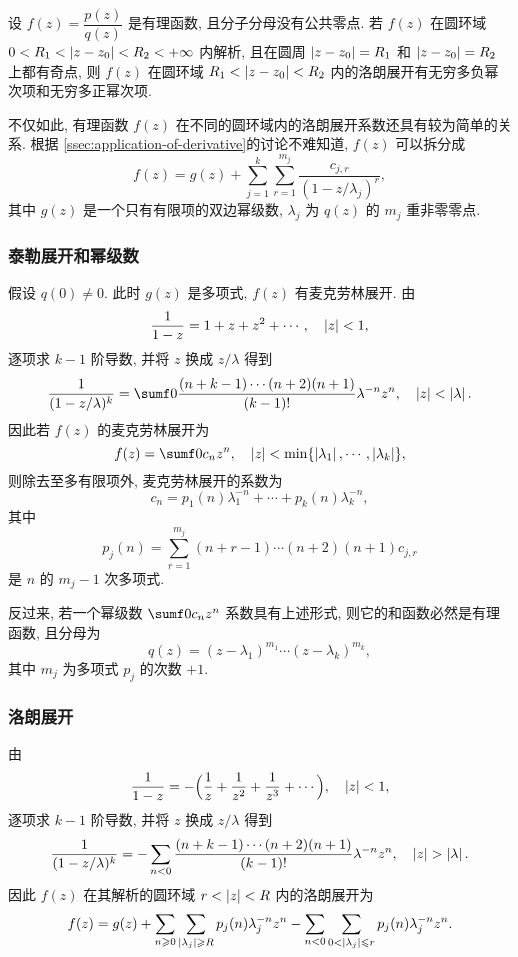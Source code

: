 \begin{example}
  设 $f(z)=\dfrac{p(z)}{q(z)}$ 是有理函数, 且分子分母没有公共零点.
  若 $f(z)$ 在圆环域 $0<R_1<\left|z-z_0\right|<R_2<+\infty$ 内解析, 且在圆周 $\left|z-z_0\right|=R_1$ 和 $\left|z-z_0\right|=R_2$ 上都有奇点, 则 $f(z)$ 在圆环域 $R_1<\left|z-z_0\right|<R_2$ 内的洛朗展开有无穷多负幂次项和无穷多正幂次项.
\end{example}

不仅如此, 有理函数 $f(z)$ 在不同的圆环域内的洛朗展开系数还具有较为简单的关系.
根据 \ref{ssec:application-of-derivative}的讨论不难知道, $f(z)$ 可以拆分成
\[
  f(z)=g(z)+\sum_{j=1}^k \sum_{r=1}^{m_j} \frac{c_{j,r}}{(1-z/\lambda_j)^r},
\]
其中 $g(z)$ 是一个只有有限项的双边幂级数, $\lambda_j$ 为 $q(z)$ 的 $m_j$ 重非零零点.


\subsubsection{泰勒展开和幂级数}

假设 $q(0)\neq 0$.
此时 $g(z)$ 是多项式, $f(z)$ 有麦克劳林展开.
由
\[
  \frac1{1-z}=1+z+z^2+\cdots,\quad \left|z\right|<1,
\]
逐项求 $k-1$ 阶导数, 并将 $z$ 换成 $z/\lambda$ 得到
\[
   \frac1{(1-z/\lambda)^k}
  =\sumf0 \frac{(n+k-1)\cdots(n+2)(n+1)}{(k-1)!}\lambda^{-n}z^n,\quad \abs{z}<\abs{\lambda}.
\]
因此若 $f(z)$ 的麦克劳林展开为
\[
  f(z)=\sumf0 c_n z^n,\quad \abs{z}<\min\{\abs{\lambda_1},\cdots,\abs{\lambda_k}\},
\]
则除去至多有限项外, 麦克劳林展开的系数为
\[
  c_n=p_1(n)\lambda_1^{-n}+\cdots+p_k(n)\lambda_k^{-n},
\]
其中
\[
  p_j(n)=\sum_{r=1}^{m_j} (n+r-1)\cdots(n+2)(n+1)c_{j,r}
\]
是 $n$ 的 $m_j-1$ 次多项式.

反过来, 若一个幂级数 $\sumf0 c_nz^n$ 系数具有上述形式, 则它的和函数必然是有理函数, 且分母为 
\[
  q(z)=(z-\lambda_1)^{m_1}\cdots (z-\lambda_k)^{m_k},
\]
其中 $m_j$ 为多项式 $p_j$ 的次数 $+1$.


\subsubsection{洛朗展开}

由
\[
  \frac1{1-z}=-\Bigl(\frac1z+\frac1{z^2}+\frac1{z^3}+\cdots\Bigr),\quad \left|z\right|<1,
\]
逐项求 $k-1$ 阶导数, 并将 $z$ 换成 $z/\lambda$ 得到
\[
    \frac1{(1-z/\lambda)^k}
   =-\sum_{n<0} \frac{(n+k-1)\cdots(n+2)(n+1)}{(k-1)!}\lambda^{-n}z^n,\quad \abs{z}>\abs{\lambda}.
\]
因此 $f(z)$ 在其解析的圆环域 $r<\left|z\right|<R$ 内的洛朗展开为
\[
  f(z)=g(z)+\sum_{n\geqslant 0} \sum_{\left|\lambda_j\right|\geqslant R} p_j(n)\lambda_j^{-n}z^n
  -\sum_{n<0} \sum_{0<\left|\lambda_j\right|\leqslant r} p_j(n)\lambda_j^{-n}z^n.
\]

